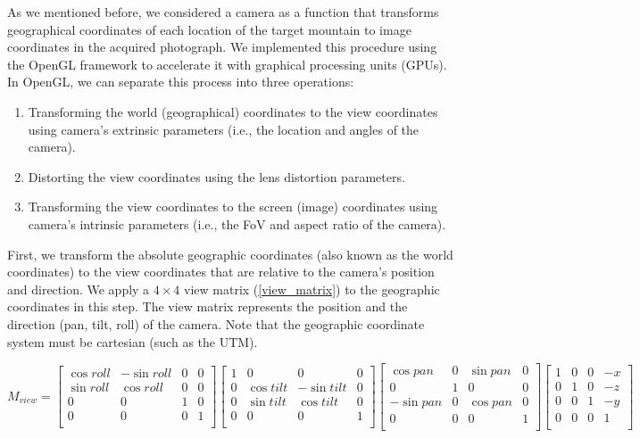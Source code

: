\documentclass{article}
\providecommand{\tightlist}{%
  \setlength{\itemsep}{0pt}\setlength{\parskip}{0pt}}
\begin{document}
As we mentioned before, we considered a camera as a function that transforms geographical coordinates of each location of the target mountain to image coordinates in the acquired photograph. We implemented this procedure using the OpenGL framework to accelerate it with graphical processing units (GPUs). In OpenGL, we can separate this process into three operations:

\begin{enumerate}
\def\labelenumi{\arabic{enumi}.}
\tightlist
\item
  Transforming the world (geographical) coordinates to the view coordinates using camera's extrinsic parameters (i.e., the location and angles of the camera).
\item
  Distorting the view coordinates using the lens distortion parameters.
\item
  Transforming the view coordinates to the screen (image) coordinates using camera's intrinsic parameters (i.e., the FoV and aspect ratio of the camera).
\end{enumerate}

First, we transform the absolute geographic coordinates (also known as the world coordinates) to the view coordinates that are relative to the camera's position and direction. We apply a \(4 \times 4\) view matrix (\ref{view_matrix}) to the geographic coordinates in this step. The view matrix represents the position and the direction (pan, tilt, roll) of the camera. Note that the geographic coordinate system must be cartesian (such as the UTM).

\label{view_matrix}
\begin{equation}
  M_{view} = 
  \begin{bmatrix}
    \cos roll & -\sin roll & 0 & 0 \\
    \sin roll & \cos roll & 0 & 0 \\
    0 & 0 & 1 & 0 \\
    0 & 0 & 0 & 1 \\
  \end{bmatrix}
  \begin{bmatrix}
    1 & 0 & 0 & 0 \\
    0 & \cos tilt & -\sin tilt & 0 \\
    0 & \sin tilt & \cos tilt & 0 \\
    0 & 0 & 0 & 1 \\
  \end{bmatrix}
  \begin{bmatrix}
    \cos pan & 0 & \sin pan & 0 \\
    0 & 1 & 0 & 0 \\
    -\sin pan & 0 & \cos pan & 0 \\
    0 & 0 & 0 & 1 \\
  \end{bmatrix}
  \begin{bmatrix}
    1 & 0 & 0 & -x \\
    0 & 1 & 0 & -z \\
    0 & 0 & 1 & -y \\
    0& 0 & 0 & 1 \\
  \end{bmatrix}
\end{equation}
\end{document}
